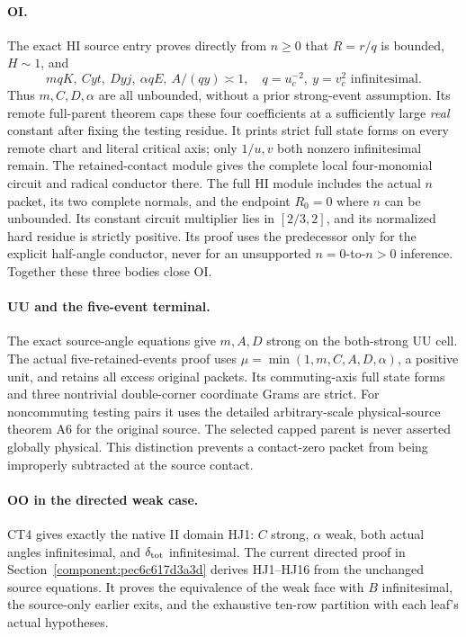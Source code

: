 \paragraph{OI.}
The exact HI source entry proves directly from \(n\geq0\)
that \(R=r/q\) is bounded, \(H\sim1\), and
\[
 mqK,\ Cyt,\ Dyj,\ \alpha qE,\ A/(qy)\asymp1,
 \quad q=u_c^{-2},\ y=v_c^2\text{ infinitesimal}.       \tag{CT15}
\]
Thus \(m,C,D,\alpha\) are all unbounded, without a prior
strong-event assumption.  Its remote full-parent theorem
caps these four coefficients at a sufficiently large
\emph{real} constant after fixing the testing residue.
It prints strict full state forms on every remote chart
and literal critical axis; only \(1/u,v\) both nonzero
infinitesimal remain.
The retained-contact module gives the complete local
four-monomial circuit and radical conductor there.
The full HI module includes the actual \(n\) packet, its
two complete normals, and the endpoint \(R_0=0\) where
\(n\) can be unbounded.  Its constant circuit multiplier
lies in \([2/3,2]\), and its normalized hard residue
is strictly positive.  Its proof uses the predecessor
only for the explicit half-angle conductor, never for
an unsupported \(n=0\)-to-\(n>0\) inference.
Together these three bodies close OI.

\paragraph{UU and the five-event terminal.}
The exact source-angle equations give \(m,A,D\) strong on
the both-strong UU cell.  The actual five-retained-events
proof uses \(\mu=\min(1,m,C,A,D,\alpha)\), a positive unit,
and retains all excess original packets.
Its commuting-axis full state forms and three nontrivial
double-corner coordinate Grams are strict.  For
noncommuting testing pairs it uses the detailed arbitrary-scale
physical-source theorem A6 for the original source.
The selected capped parent is never asserted globally
physical.  This distinction prevents a contact-zero
packet from being improperly subtracted at the source
contact.

\paragraph{OO in the directed weak case.}
CT4 gives exactly the native II domain HJ1:
\(C\) strong, \(\alpha\) weak, both actual angles
infinitesimal, and \(\delta_{\rm tot}\) infinitesimal.
The current directed proof in
Section~\ref{component:pec6c617d3a3d} derives HJ1--HJ16 from the
unchanged source equations. It proves the equivalence of the weak
face with \(B\) infinitesimal, the source-only earlier exits, and
the exhaustive ten-row partition with each leaf's actual hypotheses.

